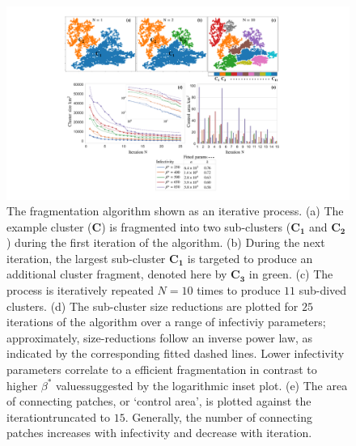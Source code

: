 \begin{figure}
    \centering
    \includegraphics[scale=0.41]{chapter7/figures/figure2-Iiterative-frag.pdf}
    \caption{The fragmentation algorithm shown as an iterative process. 
    (a) The example cluster ($\mathbf{C}$) is fragmented into two sub-clusters ($\mathbf{C_1}$ and $\mathbf{C_2}$) during the first iteration of the algorithm.
    (b) During the next iteration, the largest sub-cluster $\mathbf{C_1}$ is targeted to produce an additional cluster fragment, denoted here by $\mathbf{C_3}$ in green.
    (c) The process is iteratively repeated $N=10$ times to produce $11$ sub-dived clusters.
    (d) The sub-cluster size reductions are plotted for $25$ iterations of the algorithm over a range of infectiviy parameters;  
    approximately, size-reductions follow an inverse power law, as indicated by the corresponding fitted dashed lines.
    Lower infectivity parameters correlate to a efficient fragmentation in contrast to higher $\beta^*$ values\textemdash suggested by the logarithmic inset plot.
    (e) The area of connecting patches, or `control area', is plotted against the iteration\textemdash truncated to $15$. 
    Generally, the number of connecting patches increases with infectivity and decrease with iteration.}
    \label{fig:iterative-fragmentations}
\end{figure}

